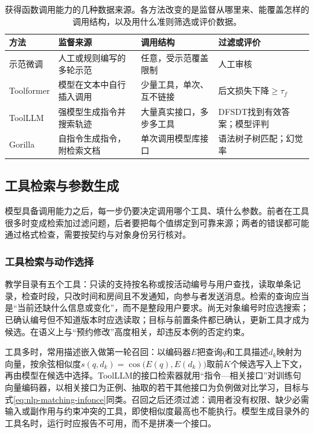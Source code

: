 \begin{table}[htbp]
\centering
\small
\begin{tabular}{p{17mm}p{24mm}p{28mm}p{26mm}}
\toprule
方法 & 监督来源 & 调用结构 & 过滤或评价 \\
\midrule
示范微调 & 人工或规则编写的多轮示范 & 任意，受示范覆盖限制 & 人工审核 \\
Toolformer & 模型在文本中自行插入调用 & 少量工具，单次、互不链接 & 后文损失下降$\geq\tau_f$ \\
ToolLLM & 强模型生成指令并搜索轨迹 & 大量真实接口，多步多工具 & DFSDT找到有效答案；模型评判 \\
Gorilla & 自指令生成指令，附检索文档 & 单次调用模型库接口 & 语法树子树匹配；幻觉率 \\
\bottomrule
\end{tabular}
\caption{获得函数调用能力的几种数据来源。各方法改变的是监督从哪里来、能覆盖怎样的调用结构，以及用什么准则筛选或评价数据。}
\label{tab:nlp-execution-tool-learning}
\end{table}

\subsection{工具检索与参数生成}
\label{sec:nlp-execution-tools}

模型具备调用能力之后，每一步仍要决定调用哪个工具、填什么参数。前者在工具很多时变成检索加过滤问题，后者要把每个值绑定到可靠来源；两者的错误都可能通过格式检查，需要按契约与对象身份另行核对。

\subsubsection{工具检索与动作选择}
\label{sec:nlp-execution-tool-selection}

教学目录有五个工具：只读的支持按名称或按活动编号与用户查找，读取单条记录，检查时段，只改时间和房间且不发通知，向参与者发送消息。检索的查询应当是“当前还缺什么信息或变化”，而不是整段用户要求。尚无对象编号时应选搜索；已确认编号但不知道版本时应选读取；目标与前置条件都已确认，更新工具才成为候选。在语义上与“预约修改”高度相关，却违反本例的否定约束。

工具多时，常用描述嵌入做第一轮召回：以编码器$E$把查询$q$和工具描述$d_k$映射为向量，按余弦相似度$s(q,d_k)=\cos\bigl(E(q),E(d_k)\bigr)$取前$K$个候选写入上下文，再由模型在候选中选择。ToolLLM的接口检索器就用“指令—相关接口”对训练句向量编码器，以相关接口为正例、抽取的若干其他接口为负例做对比学习，目标与式\eqref{eq:nlp-matching-infonce}同类。召回之后还须过滤：调用者没有权限、缺少必需输入或副作用与约束冲突的工具，即使相似度最高也不能执行。模型生成目录外的工具名时，运行时应报告不可用，而不是拼凑一个接口。

